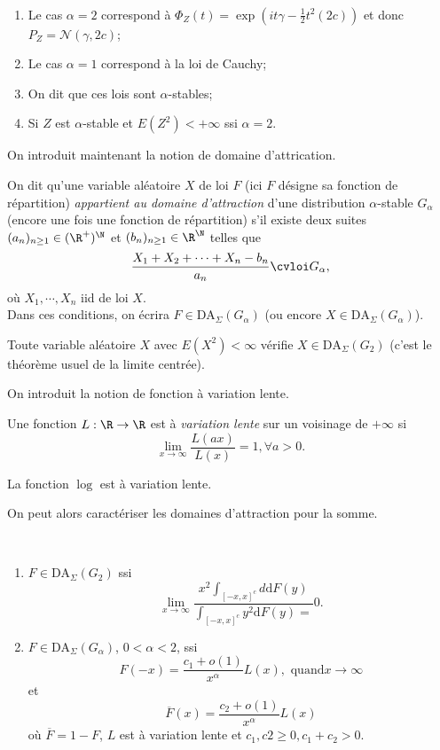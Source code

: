 \documentclass[10p,a4paper,reqno,titlepage]{report}
\begin{document}
\begin{rem}\
	\begin{enumerate}
		\item Le cas $\alpha= 2$ correspond à $\Phi_Z (t)= \exp(it\gamma - \tfrac12 t^2 (2c))$ et donc $P_Z = \mathcal N (\gamma, 2c)$;
		\item Le cas $\alpha= 1$ correspond à la loi de Cauchy;
		\item On dit que ces lois sont $\alpha$-stables;
		\item Si $Z$ est $\alpha$-stable et $E(Z^2)<+\infty $ ssi $\alpha=2$.
	\end{enumerate}
\end{rem}
On introduit maintenant la notion de domaine d'attrication.
\begin{de}
	On dit qu'une variable aléatoire $X$ de loi $F$ (ici $F$ désigne sa fonction de répartition) \textit{appartient au domaine d'attraction} d'une distribution $\alpha$-stable $G_\alpha$ (encore une fois une fonction de répartition) s'il existe deux suites $(a_n)_{n\geq 1} \in (\R^+)^\N$ et $(b_n)_{n\geq 1}\in\R^\N$ telles que 
	$$ \frac{X_1+X_2 +\cdots + X_n -b_n}{a_n} \cvloi G_\alpha,$$
	 où $X_1,\cdots,X_n$ iid de loi $X$. \\
	 Dans ces conditions, on écrira $F \in \mathrm{DA}_{\Sigma} (G_\alpha)$ (ou encore $X\in\mathrm{DA}_{\Sigma}(G_\alpha)$).
 \end{de}
\begin{rem}
	Toute variable aléatoire $X$ avec $E(X^2)<\infty$ vérifie $X\in\mathrm{DA}_{\Sigma}(G_2)$ (c'est le théorème usuel de la limite centrée).
\end{rem}
On introduit la notion de fonction à variation lente.
\begin{de}
	Une fonction $L : \R \to \R$ est à \textit{variation lente} sur un voisinage de $+\infty$ si
	$$ \lim_{x\to\infty} \frac{L(ax)}{L(x)}=1 , \forall a >0.$$
	
\end{de}
\begin{ex}
	La fonction $\log$ est à variation lente.
\end{ex}
On peut alors caractériser les domaines d'attraction pour la somme.
\begin{prop}\
	\begin{enumerate}
		\item $F \in \mathrm{DA}_{\Sigma} (G_2)$ ssi 
		$$ \lim_{x \to \infty} \frac{x^2 \int_{[-x,x]^c} d\mathrm d F(y)}{\int_{[-x,x]^c} y^2\mathrm d F(y)=}0.$$
		\item $F \in \mathrm{DA}_{\Sigma}(G_\alpha)$, $0 < \alpha <2$, ssi 
		$$ F(-x) =\frac{c_1+o(1)}{x^\alpha} L(x),\text{ quand} x\to \infty$$
		et 
		$$ \overline{F}(x)= \frac{c_2+o(1)}{x^\alpha} L(x)$$
		où $\overline{F}=1-F$, $L$ est à variation lente et $c_1,c2\geq 0, c_1+ c_2 >0.$
	\end{enumerate}
\end{prop}
\end{document}
